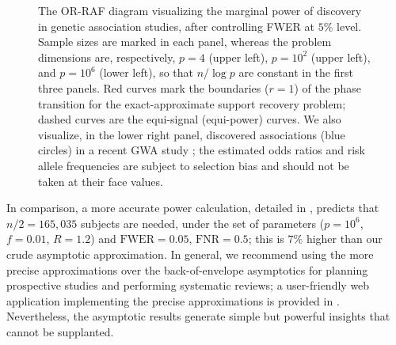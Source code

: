 \begin{figure}
      \caption{The OR-RAF diagram visualizing the marginal power of discovery in genetic association studies, after controlling FWER at $5\%$ level. 
      Sample sizes are marked in each panel, whereas the problem dimensions are, respectively, $p=4$ (upper left), $p=10^2$ (upper left), and $p=10^6$ (lower left), so that $n/\log{p}$ are constant in the first three panels.
      Red curves mark the boundaries ($r=1$) of the phase transition for the exact-approximate support recovery problem; dashed curves are the equi-signal (equi-power) curves.
      We also visualize, in the lower right panel, discovered associations (blue circles) in a recent GWA study \cite{michailidou2017association}; the estimated odds ratios and risk allele frequencies are subject to selection bias and should not be taken at their face values.} 
      \label{fig:OR-RAF_GWAS}
\end{figure}


In comparison, a more accurate power calculation, detailed in \cite{gao2019upass}, predicts that $n / 2 = 165,035$ subjects are needed, under the set of parameters ($p=10^6$, $f=0.01$, $R=1.2$) and $\mathrm{FWER}=0.05$, $\mathrm{FNR}=0.5$; this is $7\%$ higher than our crude asymptotic approximation.
In general, we recommend using the more precise approximations over the back-of-envelope asymptotics for planning prospective studies and performing systematic reviews;
a user-friendly web application implementing the precise approximations is provided in \cite{gao2019upass}.
Nevertheless, the asymptotic results generate simple but powerful insights that cannot be supplanted.
